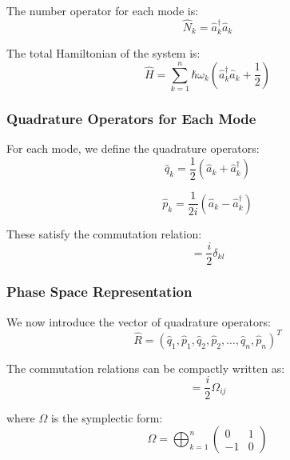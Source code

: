 The number operator for each mode is:
\begin{equation}
\hat{N}_k = \hat{a}_k^\dagger \hat{a}_k
\end{equation}

The total Hamiltonian of the system is:
\begin{equation}
\hat{H} = \sum_{k=1}^{n} \hbar \omega_k \left( \hat{a}_k^\dagger \hat{a}_k + \frac{1}{2} \right)
\end{equation}

\subsubsection{Quadrature Operators for Each Mode}

For each mode, we define the quadrature operators:
\begin{equation*}
\hat{q}_k = \frac{1}{2} (\hat{a}_k + \hat{a}_k^\dagger)
\end{equation*}

\begin{equation*}
\hat{p}_k = \frac{1}{2i} (\hat{a}_k - \hat{a}_k^\dagger)
\end{equation*}

These satisfy the commutation relation:
\begin{equation*}
[\hat{q}_k, \hat{p}_l] = \frac{i}{2} \delta_{kl}
\end{equation*}

\subsubsection{Phase Space Representation}

We now introduce the vector of quadrature operators:
\begin{equation*}
\hat{R} = (\hat{q}_1, \hat{p}_1, \hat{q}_2, \hat{p}_2, \dots, \hat{q}_n, \hat{p}_n)^T
\end{equation*}

The commutation relations can be compactly written as:
\begin{equation}
[\hat{R}_i, \hat{R}_j] = \frac{i}{2} \Omega_{ij}
\label{symp}
\end{equation}

where $\Omega$ is the symplectic form:
\begin{equation}
\Omega =
\bigoplus_{k=1}^{n}
\begin{pmatrix}
0 & 1 \\
-1 & 0
\end{pmatrix}
\end{equation}


